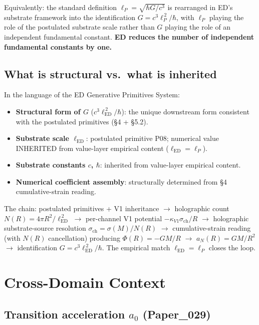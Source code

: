 \documentclass[11pt,a4paper]{article}
\begin{document}
Equivalently: the standard definition $\ell_P = \sqrt{\hbar G/c^3}$ is rearranged in ED's substrate framework into the identification $G = c^3\ell_P^{\,2}/\hbar$, with $\ell_P$ playing the role of the postulated substrate scale rather than $G$ playing the role of an independent fundamental constant. \textbf{ED reduces the number of independent fundamental constants by one.}

\subsection{What is structural vs.\ what is inherited}

In the language of the ED Generative Primitives System:

\begin{itemize}[noitemsep]
\item \textbf{Structural form of $G$} ($c^3\ell_\mathrm{ED}^{\,2}/\hbar$): the unique downstream form consistent with the postulated primitives (\S4 + \S5.2).
\item \textbf{Substrate scale $\ell_\mathrm{ED}$}: postulated primitive P08; numerical value INHERITED from value-layer empirical content ($\ell_\mathrm{ED} = \ell_P$).
\item \textbf{Substrate constants $c$, $\hbar$}: inherited from value-layer empirical content.
\item \textbf{Numerical coefficient assembly}: structurally determined from \S4 cumulative-strain reading.
\end{itemize}

The chain: postulated primitives + V1 inheritance $\to$ holographic count $N(R) = 4\pi R^2/\ell_\mathrm{ED}^{\,2}$ $\to$ per-channel V1 potential $-\kappa_{V1}\sigma_\mathrm{ch}/R$ $\to$ holographic substrate-source resolution $\sigma_\mathrm{ch} = \sigma(M)/N(R)$ $\to$ cumulative-strain reading (with $N(R)$ cancellation) producing $\Phi(R) = -GM/R$ $\to$ $a_N(R) = GM/R^2$ $\to$ identification $G = c^3\ell_\mathrm{ED}^{\,2}/\hbar$. The empirical match $\ell_\mathrm{ED} = \ell_P$ closes the loop.

\section{Cross-Domain Context}

\subsection{Transition acceleration $a_0$ (Paper\_029)}
\end{document}

